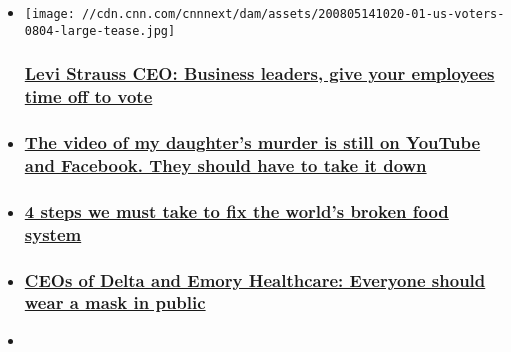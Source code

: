 \begin{itemize}
\item
  \href{/2020/08/07/perspectives/levi-strauss-ceo-chip-bergh-vote-election/index.html}{}

  \texttt{[image: //cdn.cnn.com/cnnnext/dam/assets/200805141020-01-us-voters-0804-large-tease.jpg]}

  \hypertarget{levi-strauss-ceo-business-leaders-give-your-employees-time-off-to-vote}{%
  \subsubsection{\texorpdfstring{\href{/2020/08/07/perspectives/levi-strauss-ceo-chip-bergh-vote-election/index.html}{Levi
  Strauss CEO: Business leaders, give your employees time off to
  vote}}{Levi Strauss CEO: Business leaders, give your employees time off to vote}}\label{levi-strauss-ceo-business-leaders-give-your-employees-time-off-to-vote}}
\item
  \hypertarget{the-video-of-my-daughters-murder-is-still-on-youtube-and-facebook-they-should-have-to-take-it-down-}{%
  \subsubsection{\texorpdfstring{\href{/2020/07/28/perspectives/alison-andy-parker-murder-youtube-facebook/index.html}{The
  video of my daughter's murder is still on YouTube and Facebook. They
  should have to take it down
  }}{The video of my daughter's murder is still on YouTube and Facebook. They should have to take it down }}\label{the-video-of-my-daughters-murder-is-still-on-youtube-and-facebook-they-should-have-to-take-it-down-}}
\item
  \hypertarget{4-steps-we-must-take-to-fix-the-worlds-broken-food-system}{%
  \subsubsection{\texorpdfstring{\href{/2020/07/31/perspectives/sustainable-food-systems-imf/index.html}{4
  steps we must take to fix the world's broken food
  system}}{4 steps we must take to fix the world's broken food system}}\label{4-steps-we-must-take-to-fix-the-worlds-broken-food-system}}
\item
  \hypertarget{ceos-of-delta-and-emory-healthcare-everyone-should-wear-a-mask-in-public}{%
  \subsubsection{\texorpdfstring{\href{/2020/07/22/perspectives/masks-public-delta-emory-healthcare/index.html}{CEOs
  of Delta and Emory Healthcare: Everyone should wear a mask in
  public}}{CEOs of Delta and Emory Healthcare: Everyone should wear a mask in public}}\label{ceos-of-delta-and-emory-healthcare-everyone-should-wear-a-mask-in-public}}
\item
  \hypertarget{congress-dont-re-up-the-600-unemployment-benefit-try-this-instead}{%
}
\end{itemize}
